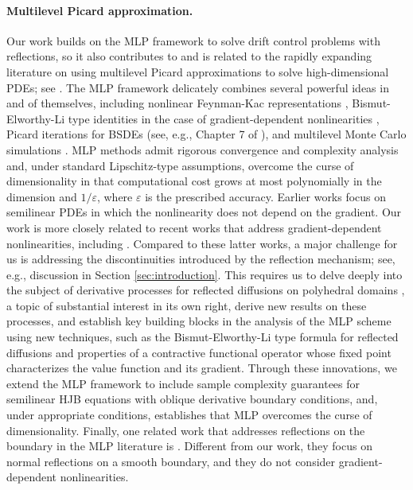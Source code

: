 \documentclass[11pt]{article}
\theoremstyle{definition}
\theoremstyle{plain}
\newcommand{\veps}{\varepsilon}
\begin{document}
\paragraph{Multilevel Picard approximation.} 
Our work builds on the MLP framework to solve drift control problems with reflections, 
so it also contributes to and is related to the rapidly expanding literature on using multilevel Picard approximations to 
solve high-dimensional PDEs; see \cite{giles2019generalised,beck2020overcoming,becker2020numerical,hutzenthaler2019multilevel,hutzenthaler2021multilevel,hutzenthaler2022multilevel,hutzenthaler2022multilevel1,HJKN2020,HJKNW2020,NW2022}. 
The MLP framework delicately combines several powerful ideas in and of themselves, 
including nonlinear Feynman-Kac representations \cite{PardouxPeng1990,Peng1991,PardouxPeng1992}, Bismut-Elworthy-Li type identities in the case of gradient-dependent nonlinearities \cite{Bismut1984,ElworthyLi1994}, 
Picard iterations for BSDEs (see, e.g., Chapter 7 of \cite{YongZhou1999}), and multilevel Monte Carlo simulations \cite{Giles2008,Giles2015}. 
MLP methods admit rigorous convergence and complexity analysis and, under standard Lipschitz-type assumptions, overcome the curse of dimensionality in that computational cost grows at most polynomially in the dimension and $1/\veps$, 
where $\veps$ is the prescribed accuracy. 
Earlier works focus on semilinear PDEs in which the nonlinearity does not depend on the gradient. 
Our work is more closely related to recent works that address gradient-dependent nonlinearities, 
including \cite{HJK2022,HK2020,NeufeldNguyenWu2025,NeufeldWu2025}. 
Compared to these latter works, a major challenge for us is addressing the discontinuities introduced by the reflection mechanism; 
see, e.g., discussion in Section \ref{sec:introduction}. This requires us to delve deeply into the subject of derivative processes 
for reflected diffusions on polyhedral domains \cite{LipshutzRamanan2018,LipshutzRamanan2019a,LipshutzRamanan2019b}, a topic of substantial interest in its own right, 
derive new results on these processes, and establish key building blocks in the analysis of the MLP scheme using new techniques, 
such as the Bismut-Elworthy-Li type formula for reflected diffusions and properties of a contractive functional operator whose fixed point 
characterizes the value function and its gradient. Through these innovations, we extend the MLP framework to 
include sample complexity guarantees for semilinear HJB equations with oblique derivative boundary conditions, 
and, under appropriate conditions, establishes that MLP overcomes the curse of dimensionality. 
Finally, one related work that addresses reflections on the boundary in the MLP literature is \cite{BoussangeBeckerJentzenKuckuckPellissier2023}. 
Different from our work, they focus on normal reflections on a smooth boundary, and they do not consider gradient-dependent nonlinearities.
\end{document}
